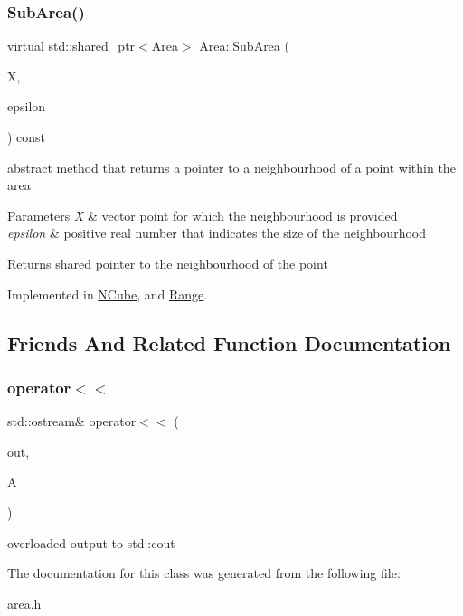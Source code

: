 \mbox{\label{class_area_a8f28e6be12d6b1bf7217f51307ab937e}} 
\subsubsection{\texorpdfstring{Sub\+Area()}{SubArea()}}
{\footnotesize\ttfamily virtual std\+::shared\+\_\+ptr$<$\hyperlink{class_area}{Area}$>$ Area\+::\+Sub\+Area (\begin{DoxyParamCaption}\item[{const \hyperlink{classv_point}{v\+Point} \&}]{X,  }\item[{double}]{epsilon }\end{DoxyParamCaption}) const\hspace{0.3cm}{\ttfamily [pure virtual]}}

abstract method that returns a pointer to a neighbourhood of a point within the area 
\begin{DoxyParams}{Parameters}
{\em X} & vector point for which the neighbourhood is provided \\
\hline
{\em epsilon} & positive real number that indicates the size of the neighbourhood \\
\hline
\end{DoxyParams}
\begin{DoxyReturn}{Returns}
shared pointer to the neighbourhood of the point 
\end{DoxyReturn}


Implemented in \hyperlink{class_n_cube_a88be716167199c626d1c5063b6929303}{N\+Cube}, and \hyperlink{class_range_ab75514ad9a6e950a15d901020a65119a}{Range}.



\subsection{Friends And Related Function Documentation}
\mbox{\label{class_area_ada6f29b8de500da1ce8e36efb839d484}} 
\subsubsection{\texorpdfstring{operator$<$$<$}{operator<<}}
{\footnotesize\ttfamily std\+::ostream\& operator$<$$<$ (\begin{DoxyParamCaption}\item[{std\+::ostream \&}]{out,  }\item[{std\+::shared\+\_\+ptr$<$ \hyperlink{class_area}{Area} $>$}]{A }\end{DoxyParamCaption})\hspace{0.3cm}{\ttfamily [friend]}}

overloaded output to std\+::cout 

The documentation for this class was generated from the following file\+:\begin{DoxyCompactItemize}
\item 
area.\+h\end{DoxyCompactItemize}
